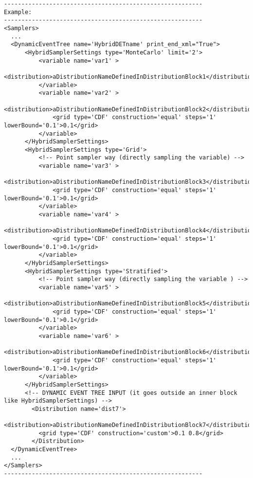 \begin{lstlisting}[style=XML]
---------------------------------------------------------
Example:
---------------------------------------------------------
<Samplers>
  ...
  <DynamicEventTree name='HybridDETname' print_end_xml="True">
      <HybridSamplerSettings type='MonteCarlo' limit='2'>
          <variable name='var1' >
              <distribution>aDistributionNameDefinedInDistributionBlock1</distribution> 
          </variable>
          <variable name='var2' >
              <distribution>aDistributionNameDefinedInDistributionBlock2</distribution> 
              <grid type='CDF' construction='equal' steps='1' lowerBound='0.1'>0.1</grid>
          </variable>
      </HybridSamplerSettings>
      <HybridSamplerSettings type='Grid'>
          <!-- Point sampler way (directly sampling the variable) -->
          <variable name='var3' >
              <distribution>aDistributionNameDefinedInDistributionBlock3</distribution> 
              <grid type='CDF' construction='equal' steps='1' lowerBound='0.1'>0.1</grid>
          </variable>
          <variable name='var4' >
              <distribution>aDistributionNameDefinedInDistributionBlock4</distribution> 
              <grid type='CDF' construction='equal' steps='1' lowerBound='0.1'>0.1</grid>
          </variable>
      </HybridSamplerSettings>
      <HybridSamplerSettings type='Stratified'>
          <!-- Point sampler way (directly sampling the variable ) -->
          <variable name='var5' >
              <distribution>aDistributionNameDefinedInDistributionBlock5</distribution> 
              <grid type='CDF' construction='equal' steps='1' lowerBound='0.1'>0.1</grid>
          </variable>
          <variable name='var6' >
              <distribution>aDistributionNameDefinedInDistributionBlock6</distribution> 
              <grid type='CDF' construction='equal' steps='1' lowerBound='0.1'>0.1</grid>
          </variable> 
      </HybridSamplerSettings>
      <!-- DYNAMIC EVENT TREE INPUT (it goes outside an inner block like HybridSamplerSettings) -->
        <Distribution name='dist7'>
          <distribution>aDistributionNameDefinedInDistributionBlock7</distribution> 
          <grid type='CDF' construction='custom'>0.1 0.8</grid>
        </Distribution>
  </DynamicEventTree>
  ...
</Samplers>
---------------------------------------------------------
\end{lstlisting}

